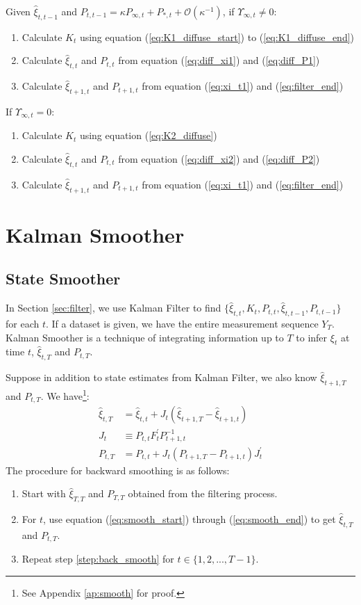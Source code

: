 \documentclass[12pt]{article}
\newenvironment{boenumerate}
    {\begin{enumerate}\renewcommand\labelenumi{\textbf\theenumi}}
    {\end{enumerate}}
\numberwithin{equation}{section}
\begin{document}
Given $\hat{\xi}_{t,t-1}$ and $P_{t,t-1}=\kappa P_{\infty,t} + P_{*,t} + \mathcal{O}(\kappa^{-1})$, if $\Upsilon_{\infty,t}\neq 0$:
\begin{boenumerate}
    \item Calculate $K_t$ using equation (\ref{eq:K1_diffuse_start}) to (\ref{eq:K1_diffuse_end})
    \item Calculate $\hat{\xi}_{t,t}$ and $P_{t,t}$ from equation (\ref{eq:diff_xi1}) and (\ref{eq:diff_P1})
    \item Calculate $\hat{\xi}_{t+1,t}$ and $P_{t+1,t}$ from equation (\ref{eq:xi_t1}) and (\ref{eq:filter_end})
\end{boenumerate}

If $\Upsilon_{\infty,t}=0$:
\begin{boenumerate}
    \item Calculate $K_t$ using equation (\ref{eq:K2_diffuse})
    \item Calculate $\hat{\xi}_{t,t}$ and $P_{t,t}$ from equation (\ref{eq:diff_xi2}) and (\ref{eq:diff_P2})
    \item Calculate $\hat{\xi}_{t+1,t}$ and $P_{t+1,t}$ from equation (\ref{eq:xi_t1}) and (\ref{eq:filter_end})
\end{boenumerate}

\section{Kalman Smoother} \label{sec:smoother}
\subsection{State Smoother}
In Section \ref{sec:filter}, we use Kalman Filter to find $\{\hat{\xi}_{t,t}, K_t, P_{t,t}, \hat{\xi}_{t,t-1}, P_{t,t-1}\}$ for each $t$. If a dataset is given, we have the entire measurement sequence $Y_T$. Kalman Smoother is a technique of integrating information up to $T$ to infer $\xi_t$ at time $t$, $\hat{\xi}_{t,T}$ and $P_{t,T}$. 

Suppose in addition to state estimates from Kalman Filter, we also know $\hat{\xi}_{t+1,T}$ and $P_{t,T}$. We have\footnote{See Appendix \ref{ap:smooth} for proof.}:
\begin{align}
    \hat{\xi}_{t,T} &= \hat{\xi}_{t,t} + J_t(\hat{\xi}_{t+1,T}-\hat{\xi}_{t+1,t}) \label{eq:smooth_start} \\
    J_t & \equiv P_{t,t}F_t^{'}P_{t+1,t}^{-1} \\
    P_{t,T} &= P_{t,t} + J_t(P_{t+1,T}-P_{t+1,t})J_t^{'} \label{eq:smooth_end}
\end{align}
The procedure for backward smoothing is as follows:
\begin{boenumerate}
    \item Start with $\hat{\xi}_{T,T}$ and $P_{T,T}$ obtained from the filtering process.
    \item \label{step:back_smooth} For $t$, use equation (\ref{eq:smooth_start}) through (\ref{eq:smooth_end}) to get $\hat{\xi}_{t,T}$ and $P_{t,T}$.
    \item Repeat step \ref{step:back_smooth} for $t \in \{1,2,...,T-1\}$.
\end{boenumerate}
\end{document}
